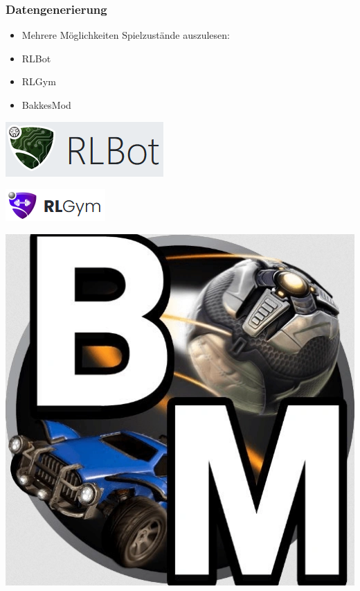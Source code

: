 \documentclass{beamer}
\begin{document}
 \begin{frame}
 \frametitle{Datengenerierung}
 \begin{minipage}[c]{0.7\textwidth}
  \begin{itemize}
   \item Mehrere Möglichkeiten Spielzustände auszulesen:
   \item RLBot
   \item RLGym
   \item BakkesMod
  \end{itemize}
  \end{minipage}
\begin{minipage}[c]{0.28\textwidth}
 \begin{minipage}[c]{0.33\textheight}
  \includegraphics[width=\textwidth]{RLBot.png}
 \end{minipage}
 \begin{minipage}[c]{0.33\textheight}
  \includegraphics[width=\textwidth]{rlgym.png}
 \end{minipage}
 \begin{minipage}[c]{0.15\textheight}
  \includegraphics[width=\textwidth]{BakkesMod.png}

\end{minipage}
\end{minipage}
\end{frame}
\end{document}
